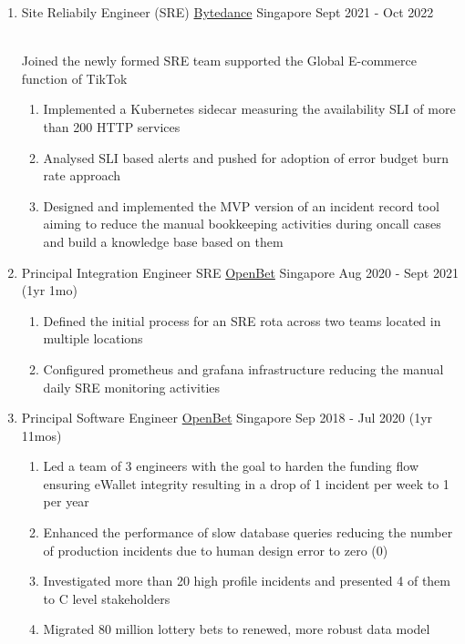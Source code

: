 \documentclass{CVSoftwareEngineer}
\begin{document}
	\begin{enumerate}[labelwidth=!, labelindent=0pt, leftmargin=*, rightmargin=15pt]
		\item[] \cvExperience
			{Site Reliabily Engineer (SRE)}
			{\href{https://www.bytedance.com/en}{Bytedance}}
			{Singapore}
			{Sept 2021 - Oct 2022}
			{
				\\ Joined the newly formed SRE team supported the Global E-commerce function of TikTok
				\begin{enumerate}[labelwidth=!, labelindent=0pt, nosep, leftmargin=*]
					\item[\textasteriskcentered] Implemented a Kubernetes sidecar measuring the availability SLI of more than 200 HTTP services
					\item[\textasteriskcentered] Analysed SLI based alerts and pushed for adoption of error budget burn rate approach
					\item[\textasteriskcentered] Designed and implemented the MVP version of an incident record tool aiming to reduce the manual bookkeeping activities during oncall cases and build a knowledge base based on them
				\end{enumerate}
			}

		\item[] \cvExperience
			{Principal Integration Engineer \textbar SRE}
			{\href{https://www.openbet.com/}{OpenBet}}
			{Singapore}
			{Aug 2020 - Sept 2021 (1yr 1mo)}
			{\begin{enumerate}[labelwidth=!, labelindent=0pt, nosep, leftmargin=*]
					\item[\textasteriskcentered] Defined the initial process for an SRE rota across two teams located in multiple locations
					\item[\textasteriskcentered] Configured prometheus and grafana infrastructure reducing the manual daily SRE monitoring activities
				\end{enumerate}
			}

		\item[] \cvExperience
			{Principal Software Engineer}
			{\href{https://www.openbet.com/}{OpenBet}}
			{Singapore}
			{Sep 2018 - Jul 2020 (1yr 11mos)}
			{\begin{enumerate}[labelwidth=!, labelindent=0pt, nosep, leftmargin=*]
					\item[\textasteriskcentered] Led a team of 3 engineers with the goal to harden the
						funding flow ensuring eWallet integrity resulting in a drop of 1 incident per week
						to 1 per year
					\item[\textasteriskcentered] Enhanced the performance of slow database queries reducing
						the number of production incidents due to human design error to zero (0)
					\item[\textasteriskcentered] Investigated more than 20 high profile incidents and
						presented 4 of them to C level stakeholders
					\item[\textasteriskcentered] Migrated 80 million lottery bets to renewed,
						more robust data model
				\end{enumerate}
			}


\end{enumerate}
\end{document}
